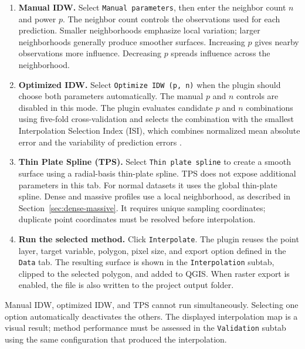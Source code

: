\documentclass[11pt,a4paper]{article}
\begin{document}
\begin{enumerate}
    \item \textbf{Manual IDW.} Select \texttt{Manual parameters}, then enter the neighbor count $n$ and power $p$. The neighbor count controls the observations used for each prediction. Smaller neighborhoods emphasize local variation; larger neighborhoods generally produce smoother surfaces. Increasing $p$ gives nearby observations more influence. Decreasing $p$ spreads influence across the neighborhood.


    \item \textbf{Optimized IDW.} Select \texttt{Optimize IDW (p, n)} when the plugin should choose both parameters automatically. The manual $p$ and $n$ controls are disabled in this mode. The plugin evaluates candidate $p$ and $n$ combinations using five-fold cross-validation and selects the combination with the smallest Interpolation Selection Index (ISI), which combines normalized mean absolute error and the variability of prediction errors \citep{bierdesouza2017}.


    \item \textbf{Thin Plate Spline (TPS).} Select \texttt{Thin plate spline} to create a smooth surface using a radial-basis thin-plate spline. TPS does not expose additional parameters in this tab. For normal datasets it uses the global thin-plate spline. Dense and massive profiles use a local neighborhood, as described in Section~\ref{sec:dense-massive}. It requires unique sampling coordinates; duplicate point coordinates must be resolved before interpolation.




    \item \textbf{Run the selected method.} Click \texttt{Interpolate}. The plugin reuses the point layer, target variable, polygon, pixel size, and export option defined in the \texttt{Data} tab. The resulting surface is shown in the \texttt{Interpolation} subtab, clipped to the selected polygon, and added to QGIS. When raster export is enabled, the file is also written to the project output folder.
\end{enumerate}

\begin{infobox}
Manual IDW, optimized IDW, and TPS cannot run simultaneously. Selecting one option automatically deactivates the others. The displayed interpolation map is a visual result; method performance must be assessed in the \texttt{Validation} subtab using the same configuration that produced the interpolation.
\end{infobox}
\end{document}
